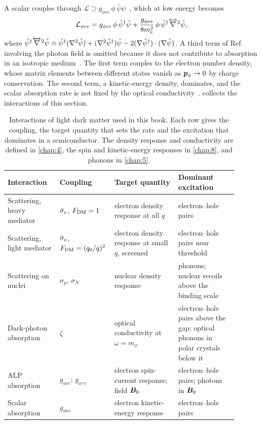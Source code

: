 A scalar couples through $\mathcal{L} \supset g_{\phi ee}\,\phi\,\bar\psi\psi$~\cite[Eq.~(3)]{mitridate2021dark}, which at low energy becomes~\cite[Eq.~(18) and Table~I]{mitridate2021dark}
\begin{equation}
  \mathcal{L}_{\phi ee} = g_{\phi ee}\,\phi\,\hat{\psi}^\dagger\hat{\psi} + \frac{g_{\phi ee}}{8m_e^2}\,\phi\,\hat{\psi}^\dagger\overleftrightarrow{\nabla}^{2}\hat{\psi} ,
  \label{eq:1.4-scalar}
\end{equation}
where $\hat{\psi}^\dagger\overleftrightarrow{\nabla}^{2}\hat{\psi} \equiv \hat{\psi}^\dagger(\nabla^2\hat{\psi}) + (\nabla^2\hat{\psi}^\dagger)\hat{\psi} - 2(\nabla\hat{\psi}^\dagger)\cdot(\nabla\hat{\psi})$. A third term of Ref.~\cite[Eq.~(18)]{mitridate2021dark} involving the photon field is omitted because it does not contribute to absorption in an isotropic medium~\cite[Table~I]{mitridate2021dark}. The first term couples to the electron number density, whose matrix elements between different states vanish as $\bm{p}_\phi \to 0$ by charge conservation. The second term, a kinetic-energy density, dominates, and the scalar absorption rate is not fixed by the optical conductivity~\cite[Table~I]{mitridate2021dark}.  collects the interactions of this section.

\begin{table}[t]
  \caption{Interactions of light dark matter used in this book. Each row gives the coupling, the target quantity that sets the rate and the excitation that dominates in a semiconductor. The density response and conductivity are defined in \cref{chap:4}, the spin and kinetic-energy responses in \cref{chap:8}, and phonons in \cref{chap:5}.}
  \label{tab:1-interactions}
  \centering\small
  \begin{tabular}{@{}>{\raggedright\arraybackslash}p{0.22\linewidth}>{\raggedright\arraybackslash}p{0.16\linewidth}>{\raggedright\arraybackslash}p{0.27\linewidth}>{\raggedright\arraybackslash}p{0.25\linewidth}@{}}
    \toprule
    Interaction & Coupling & Target quantity & Dominant excitation \\
    \midrule
    Scattering, heavy mediator & $\bar{\sigma}_{e}$, $F_{\mathrm{DM}} = 1$ & electron density response at all $q$ & electron--hole pairs \\
    Scattering, light mediator & $\bar{\sigma}_{e}$, $F_{\mathrm{DM}} = (q_0/q)^2$ & electron density response at small $q$, screened & electron--hole pairs near threshold \\
    Scattering on nuclei & $\sigma_p$, $\sigma_N$ & nuclear density response & phonons; nuclear recoils above the binding scale \\
    Dark-photon absorption & $\zeta$ & optical conductivity at $\omega = m_\phi$ & electron--hole pairs above the gap; optical phonons in polar crystals below it \\
    ALP absorption & $g_{aee}$; $g_{a\gamma\gamma}$ & electron spin-current response; field $\bm{B}_0$ & electron--hole pairs; photons in $\bm{B}_0$ \\
    Scalar absorption & $g_{\phi ee}$ & electron kinetic-energy response & electron--hole pairs \\
    \bottomrule
  \end{tabular}
\end{table}


